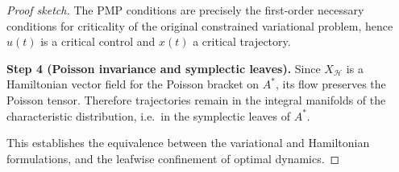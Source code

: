 \documentclass[10pt,a4paper]{amsart}
\begin{document}
\begin{proof}[Proof sketch]

The PMP conditions are precisely the first-order necessary conditions for criticality of the original constrained variational problem, hence $u(t)$ is a critical control and $x(t)$ a critical trajectory.

\medskip
\noindent\textbf{Step 4 (Poisson invariance and symplectic leaves).}
Since $X_{\mathcal H}$ is a Hamiltonian vector field for the Poisson bracket on $A^*$, its flow preserves the Poisson tensor. Therefore trajectories remain in the integral manifolds of the characteristic distribution, i.e.\ in the symplectic leaves of $A^*$.

\medskip
This establishes the equivalence between the variational and Hamiltonian formulations, and the leafwise confinement of optimal dynamics.
\end{proof}
\end{document}
